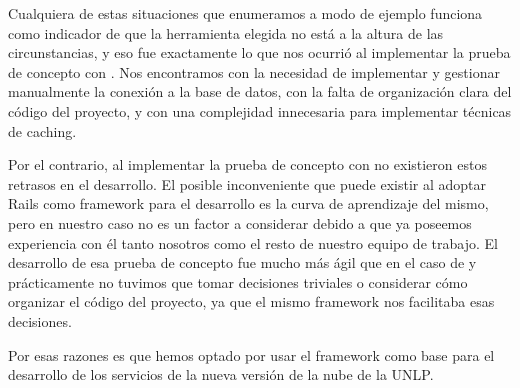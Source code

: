 Cualquiera de estas situaciones que enumeramos a modo de ejemplo funciona como indicador de que la herramienta elegida no está a la altura de las circunstancias, y eso fue exactamente lo que nos ocurrió al implementar la prueba de concepto con . Nos encontramos con la necesidad de implementar y gestionar manualmente la conexión a la base de datos, con la falta de organización clara del código del proyecto, y con una complejidad innecesaria para implementar técnicas de caching.

Por el contrario, al implementar la prueba de concepto con  no existieron estos retrasos en el desarrollo. El posible inconveniente que puede existir al adoptar Rails como framework para el desarrollo es la curva de aprendizaje del mismo, pero en nuestro caso no es un factor a considerar debido a que ya poseemos experiencia con él tanto nosotros como el resto de nuestro equipo de trabajo. El desarrollo de esa prueba de concepto fue mucho más ágil que en el caso de  y prácticamente no tuvimos que tomar decisiones triviales o considerar cómo organizar el código del proyecto, ya que el mismo framework nos facilitaba esas decisiones.

Por esas razones es que hemos optado por usar el framework  como base para el desarrollo de los servicios de la nueva versión de la nube de la UNLP.
